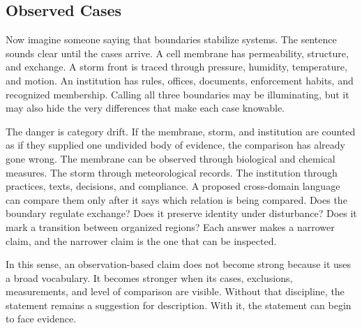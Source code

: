 \documentclass[11pt,a4paper,openany]{book}
\begin{document}
\subsection{Observed Cases}
Now imagine someone saying that boundaries stabilize systems. The sentence sounds clear until the cases arrive. A cell membrane has permeability, structure, and exchange. A storm front is traced through pressure, humidity, temperature, and motion. An institution has rules, offices, documents, enforcement habits, and recognized membership. Calling all three boundaries may be illuminating, but it may also hide the very differences that make each case knowable. \cite{grimmett_percolation,goldenfeld_lectures}\par
The danger is category drift. If the membrane, storm, and institution are counted as if they supplied one undivided body of evidence, the comparison has already gone wrong. The membrane can be observed through biological and chemical measures. The storm through meteorological records. The institution through practices, texts, decisions, and compliance. A proposed cross-domain language can compare them only after it says which relation is being compared. Does the boundary regulate exchange? Does it preserve identity under disturbance? Does it mark a transition between organized regions? Each answer makes a narrower claim, and the narrower claim is the one that can be inspected.\par
In this sense, an observation-based claim does not become strong because it uses a broad vocabulary. It becomes stronger when its cases, exclusions, measurements, and level of comparison are visible. Without that discipline, the statement remains a suggestion for description. With it, the statement can begin to face evidence.\par
\end{document}
